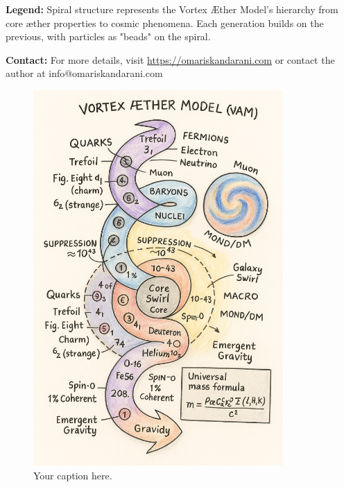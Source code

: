 \documentclass{article}
\begin{document}
    \vspace{0.5cm}
    \noindent
    \textbf{Legend:} Spiral structure represents the Vortex Æther Model's hierarchy from core æther properties to cosmic phenomena. Each generation builds on the previous, with particles as "beads" on the spiral.

    \vspace{0.5cm}
    \noindent
    \textbf{Contact:} For more details, visit \url{https://omariskandarani.com} or contact the author at info@omariskandarani.com


\begin{figure}[h!]
\centering
\includegraphics[width=0.85\textwidth]{images/ChatGPT Image Jul 15, 2025, 07_13_22 PM}
\caption{Your caption here.}
\end{figure}
\end{document}
